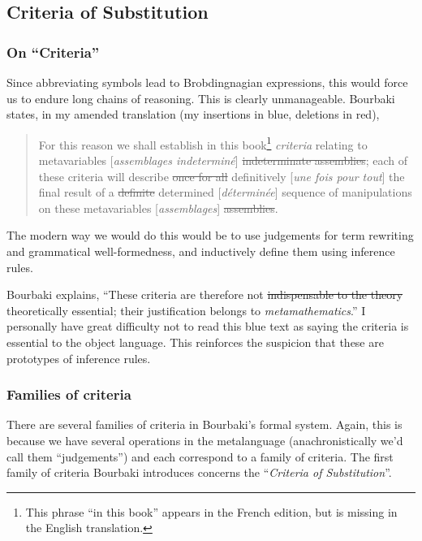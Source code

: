 \subsection{Criteria of Substitution}

\subsubsection{On ``Criteria''}\label{subsec:on-criteria}
Since abbreviating symbols lead to Brobdingnagian expressions, this
would force us to endure long chains of reasoning. This is clearly
unmanageable. Bourbaki states, in my amended translation (my insertions
in blue, deletions in red),
\begin{quote}
For this reason we shall establish {\color{blue}in this book}\footnote{This phrase ``in this book'' appears in the French
edition, but is missing in the English translation.}
\emph{criteria} relating to {\color{blue}metavariables
  [\textit{assemblages indetermin\'e}]} {\color{red}\st{indeterminate assemblies}};
each of these criteria will
describe {\color{red}\st{once for all}} {\color{blue}definitively}
[\textit{une fois pour tout}] the final result of a
{\color{red}\st{definite}} {\color{blue}determined} [\textit{d\'{e}termin\'{e}e}]
sequence of manipulations
on these {\color{blue}metavariables
  [\textit{assemblages}]} {\color{red}\st{assemblies}}.
\end{quote}
The modern way we would do this would be to use judgements for term
rewriting and grammatical well-formedness, and inductively define them
using inference rules.

Bourbaki explains, ``These criteria are therefore not {\color{red}\st{indispensable to the theory}} {\color{blue}theoretically essential}; their justification belongs to \emph{metamathematics}.''
I personally have great difficulty not to read this blue text as saying
the criteria is essential to the object language.
This reinforces the suspicion that these are prototypes of inference
rules.

\subsubsection{Families of criteria}
There are several families of criteria in Bourbaki's formal
system. Again, this is because we have several operations in the
metalanguage (anachronistically we'd call them ``judgements'') and each
correspond to a family of criteria. The first family of criteria
Bourbaki introduces concerns the ``\textit{Criteria of Substitution}''.

